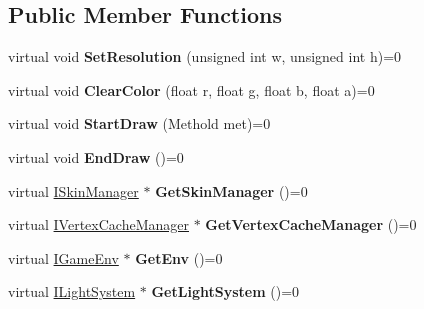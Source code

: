 \subsection*{Public Member Functions}
\begin{DoxyCompactItemize}
\item 
virtual void {\bfseries Set\+Resolution} (unsigned int w, unsigned int h)=0\hypertarget{class_i_render_device_a16610c564d6d83150e665c84f3c7f4e7}{}\label{class_i_render_device_a16610c564d6d83150e665c84f3c7f4e7}

\item 
virtual void {\bfseries Clear\+Color} (float r, float g, float b, float a)=0\hypertarget{class_i_render_device_ae943d89342c87e47aa7a20c4ea188969}{}\label{class_i_render_device_ae943d89342c87e47aa7a20c4ea188969}

\item 
virtual void {\bfseries Start\+Draw} (Methold met)=0\hypertarget{class_i_render_device_ae3b6bc5189323216fe51b46fb2d3f3f9}{}\label{class_i_render_device_ae3b6bc5189323216fe51b46fb2d3f3f9}

\item 
virtual void {\bfseries End\+Draw} ()=0\hypertarget{class_i_render_device_a85bb78a4ac85dd244d622dfd3a1507d0}{}\label{class_i_render_device_a85bb78a4ac85dd244d622dfd3a1507d0}

\item 
virtual \hyperlink{class_i_skin_manager}{I\+Skin\+Manager} $\ast$ {\bfseries Get\+Skin\+Manager} ()=0\hypertarget{class_i_render_device_af9532fb7c9230338b8aed4bf7b7a08ce}{}\label{class_i_render_device_af9532fb7c9230338b8aed4bf7b7a08ce}

\item 
virtual \hyperlink{class_i_vertex_cache_manager}{I\+Vertex\+Cache\+Manager} $\ast$ {\bfseries Get\+Vertex\+Cache\+Manager} ()=0\hypertarget{class_i_render_device_a91bfb04dc14f04af8e12303a30dd7893}{}\label{class_i_render_device_a91bfb04dc14f04af8e12303a30dd7893}

\item 
virtual \hyperlink{class_i_game_env}{I\+Game\+Env} $\ast$ {\bfseries Get\+Env} ()=0\hypertarget{class_i_render_device_aab8b22504153c63b934ef8bfd95b45bb}{}\label{class_i_render_device_aab8b22504153c63b934ef8bfd95b45bb}

\item 
virtual \hyperlink{class_i_light_system}{I\+Light\+System} $\ast$ {\bfseries Get\+Light\+System} ()=0\hypertarget{class_i_render_device_a5253dfb25d33e1f5189f5b0c0be13b1b}{}\label{class_i_render_device_a5253dfb25d33e1f5189f5b0c0be13b1b}


\end{DoxyCompactItemize}

